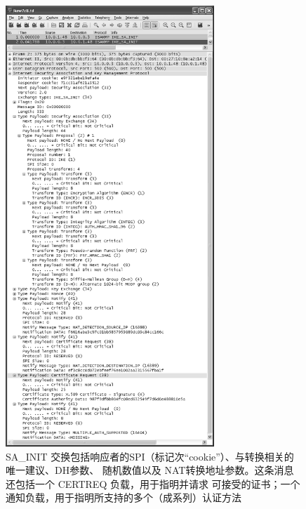 \begin{figure}[!htb]
    \centering
	\includegraphics[width=0.7\textwidth]{imgs/18/18-23.png}
	\caption{SA\_INIT 交换包括响应者的SPI（标记次“cookie”）、与转换相关的唯一建议、DH参数、
            随机数值以及 NAT转换地址参数。这条消息还包括一个 CERTREQ 负载，用于指明并请求
            可接受的证书；一个通知负载，用于指明所支持的多个（成系列）认证方法}
\end{figure}

